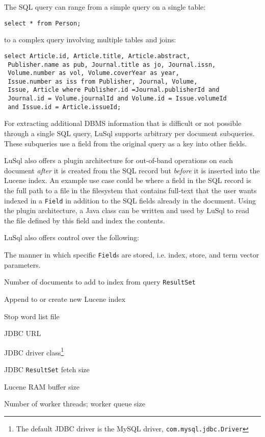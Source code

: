 \noindent The SQL query can range from a simple query on a single table: 


\begin{lstlisting}[backgroundcolor=\color{grey}]
  select * from Person;
\end{lstlisting}

\noindent 
to a complex query involving multiple
tables and joins:
\begin{lstlisting}[backgroundcolor=\color{grey}]
select Article.id, Article.title, Article.abstract,
 Publisher.name as pub, Journal.title as jo, Journal.issn,
 Volume.number as vol, Volume.coverYear as year, 
 Issue.number as iss from Publisher, Journal, Volume, 
 Issue, Article where Publisher.id =Journal.publisherId and 
 Journal.id = Volume.journalId and Volume.id = Issue.volumeId 
 and Issue.id = Article.issueId;
\end{lstlisting}

\noindent For extracting additional DBMS information that is difficult or not possible
through a single SQL query, LuSql supports arbitrary per document subqueries.
These subqueries use a field from the original query as a key into other
fields. 

LuSql also offers a plugin architecture for out-of-band
operations on each document {\em after} it is created from the SQL
record but {\em before} it is inserted into the Lucene index. 
An example use case could be where a field in the SQL record is the full path
to a file in the filesystem that contains full-text that the user wants
indexed in a {\tt Field} in addition to the SQL fields already in the document.
 Using the plugin architecture, a Java class can be written and used by LuSql
 to read the file defined by this field and index the contents.



LuSql also offers control over the following:
\begin{mlist}
\item The manner in which specific {\tt Field}s are stored, i.e. index, store,
  and term vector parameters. 
\item Number of documents to add to index from query {\tt ResultSet}
\item Append to or create new Lucene index
\item Stop word list file
\item JDBC URL
\item JDBC driver class\footnote{The default JDBC driver is the MySQL
    driver, {\tt com.mysql.jdbc.Driver}}
\item JDBC {\tt ResultSet} fetch size
\item Lucene RAM buffer size 
\item Number of worker threads; worker queue size
\end{mlist}

